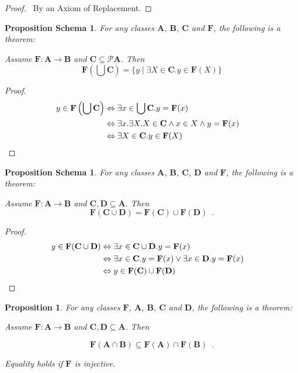 \documentclass{book}
\let\qed\relax
\newtheorem{prop}[ax]{Proposition}
\newtheorem{props}[ax]{Proposition Schema}
\theoremstyle{definition}
\begin{document}
\begin{proof}
\pf\ By an Axiom of Replacement. \qed
\end{proof}

\begin{props}
\label{prop:imgunion}
For any classes $\mathbf{A}$, $\mathbf{B}$, $\mathbf{C}$ and $\mathbf{F}$, the following is a theorem:

Assume $\mathbf{F} : \mathbf{A} \rightarrow \mathbf{B}$ and $\mathbf{C} \subseteq \mathcal{P} \mathbf{A}$. Then
\[ \mathbf{F} \left( \bigcup \mathbf{C} \right) = \{ y \mid \exists X \in \mathbf{C}. y \in \mathbf{F}(X) \} \]
\end{props}

\begin{proof}
\pf
\begin{align*}
	y \in \mathbf{F} \left( \bigcup \mathbf{C} \right) & \Leftrightarrow \exists x \in \bigcup \mathbf{C}. y = \mathbf{F}(x) \\
	& \Leftrightarrow \exists x. \exists X. X \in \mathbf{C} \wedge x \in X \wedge y = \mathbf{F}(x) \\
	& \Leftrightarrow \exists X \in \mathbf{C}. y \in \mathbf{F}(X) & \qed
\end{align*}
\end{proof}

\begin{props}
For any classes $\mathbf{A}$, $\mathbf{B}$, $\mathbf{C}$, $\mathbf{D}$ and $\mathbf{F}$, the following is a theorem:

Assume $\mathbf{F} : \mathbf{A} \rightarrow \mathbf{B}$ and $\mathbf{C}, \mathbf{D} \subseteq \mathbf{A}$. Then
\[ \mathbf{F}(\mathbf{C} \cup \mathbf{D}) = \mathbf{F}(\mathbf{C}) \cup \mathbf{F}(\mathbf{D}) \enspace . \]
\end{props}

\begin{proof}
\pf
\begin{align*}
	y \in \mathbf{F}(\mathbf{C} \cup \mathbf{D})
	& \Leftrightarrow \exists x \in \mathbf{C} \cup \mathbf{D}. y = \mathbf{F}(x) \\
	& \Leftrightarrow \exists x \in \mathbf{C}. y = \mathbf{F}(x) \vee \exists x \in \mathbf{D}. y = \mathbf{F}(x) \\
	& \Leftrightarrow y \in \mathbf{F}(\mathbf{C}) \cup \mathbf{F}(\mathbf{D}) & \qed
\end{align*}
\end{proof}

\begin{prop}
For any classes $\mathbf{F}$, $\mathbf{A}$, $\mathbf{B}$, $\mathbf{C}$ and $\mathbf{D}$, the following is a theorem:

Assume $\mathbf{F} : \mathbf{A} \rightarrow \mathbf{B}$ and $\mathbf{C}, \mathbf{D} \subseteq \mathbf{A}$. Then

\[ \mathbf{F}(\mathbf{A} \cap \mathbf{B}) \subseteq \mathbf{F}(\mathbf{A}) \cap \mathbf{F}(\mathbf{B}) \enspace . \]

Equality holds if $\mathbf{F}$ is injective.
\end{prop}
\end{document}
